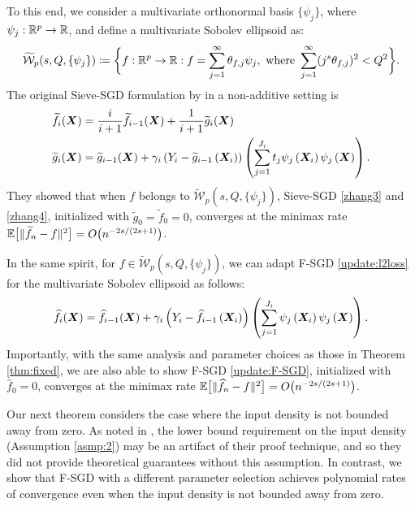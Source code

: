 To this end, we consider a multivariate orthonormal basis $\{\psi_{j}\}$, where $\psi_j:\mathbb{R}^p \to \mathbb{R}$, and define a multivariate Sobolev ellipsoid as:
\begin{align}\label{tilde_W}
\widetilde{\mathcal{W}}_p(s,Q, \{\psi_j\}) \coloneqq \bigg\{f:\mathbb{R}^p \to \mathbb{R}  : f = \sum_{j=1}^\infty \theta_{f,j}\psi_j, \text{ where } \sum_{j=1}^\infty (j^s\theta_{f,j})^2 < Q^2\bigg\}.
\end{align}
The original Sieve-SGD formulation by \cite{zhang2022sieve} in a non-additive setting is
\begin{align}
   &  \widetilde{f}_i(\bm{X}) = \frac{i}{i+1}\widetilde{f}_{i-1}(\bm{X}) + \frac{1}{i+1} \widetilde g_i(\bm{X}) \label{zhang3}\\
    & \widetilde g_i(\bm{X}) = \widetilde g_{i-1}(\bm{X}) + \gamma_i\left(Y_i - \widetilde g_{i-1}\left(\bm{X}_i\right)\right)\left(\sum_{j=1}^{J_{i}}t_{j}\psi_{j}\left(\bm{X}_i\right)\psi_{j}\left(\bm{X}\right)\right). \label{zhang4}
\end{align}
They showed that when $f$ belongs to $\tilde{\mathcal{W}}_p(s,Q, \{\psi_j\})$,  Sieve-SGD \eqref{zhang3} and \eqref{zhang4}, initialized with $\tilde g_0=\tilde f_0 =0$, converges at the minimax rate $\mathbb{E} \big[ \| \widetilde{f}_n - f\|^2 \big] = O\big(n^{-2s/(2s+1)}\big)$.

In the same spirit, for $f \in \tilde{\mathcal{W}}_p(s,Q, \{\psi_j\})$, we can adapt F-SGD \eqref{update:l2loss} for the multivariate Sobolev ellipsoid as follows:
\begin{align}
    \widehat f_i(\bm{X}) = \widehat f_{i-1}(\bm{X}) + \gamma_i\left(Y_i - \widehat f_{i-1}\left(\bm{X}_i\right)\right)\left(\sum_{j=1}^{J_{i}}\psi_{j}\left(\bm{X}_i\right)\psi_{j}\left(\bm{X}\right)\right). \label{update:F-SGD}
\end{align}
Importantly, with the same analysis and parameter choices as those in Theorem \ref{thm:fixed}, we are also able to show F-SGD \eqref{update:F-SGD}, initialized with $\hat f_0=0$, converges at the minimax rate $\mathbb{E} \big[ \| \widehat{f}_n - f\|^2 \big] = O\big(n^{-2s/(2s+1)}\big)$.

Our next theorem considers the case where the input density is not bounded away from zero. As noted in \cite{zhang2022sieve}, the lower bound requirement on the input density (Assumption \ref{asmp:2}) may be an artifact of their proof technique, and so they did not provide theoretical guarantees without this assumption. In contrast, we show that F-SGD with a different parameter selection achieves polynomial rates of convergence even when the input density is not bounded away from zero.

